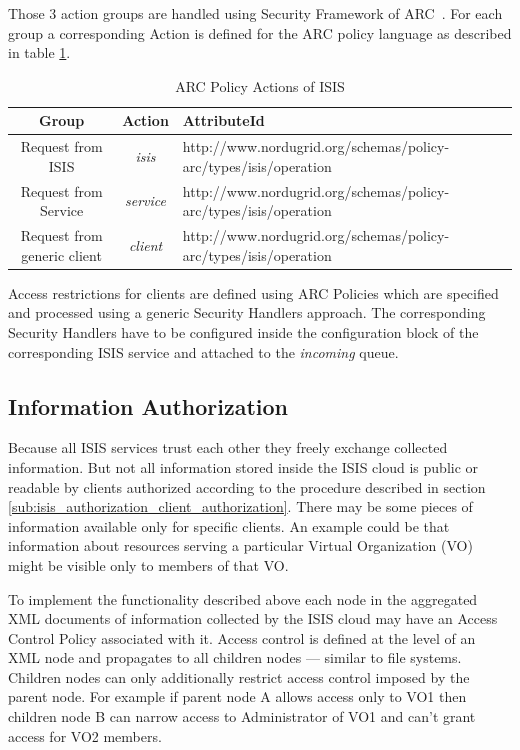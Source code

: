 \documentclass{book}
\begin{document}
Those 3 action groups are handled using Security Framework of ARC~\cite{arc1-security}. For each group a corresponding
Action is defined for the ARC policy language as described in table \ref{tab:policy_actions}.

\begin{table}[h]
\caption{ARC Policy Actions of ISIS}
\label{tab:policy_actions}
\begin{tabular}{|c|c|l|}
\hline
\textbf{Group}&\textbf{Action}&\textbf{AttributeId}\\
\hline
Request from ISIS&\textit{isis}&http://www.nordugrid.org/schemas/policy-arc/types/isis/operation\\
\hline
Request from Service&\textit{service}&http://www.nordugrid.org/schemas/policy-arc/types/isis/operation\\
\hline
Request from generic client&\textit{client}&http://www.nordugrid.org/schemas/policy-arc/types/isis/operation\\
\hline
\end{tabular}
\end{table}

Access restrictions for clients are defined using ARC Policies which are specified and 
processed using a generic Security Handlers approach. The corresponding Security Handlers have to be 
configured inside the configuration block of the corresponding ISIS service and attached to the
\textit{incoming} queue.



\subsection{Information Authorization}
\label{sub:isis_authorization_information_authorization}

Because all ISIS services trust each other they freely exchange collected information. But 
not all information stored inside the ISIS cloud is public or readable by clients authorized according 
to the procedure described in section \ref{sub:isis_authorization_client_authorization}. There
may be some pieces of information available only for specific clients. An example could be that
information about resources serving a particular Virtual Organization (VO) might be visible only to
members of that VO.

To implement the functionality described above each node in the aggregated XML documents of information
collected by the ISIS cloud may have an Access Control Policy associated with it. Access control is 
defined at the level of an XML node and propagates to all children nodes --- similar to file systems.
Children nodes can only additionally restrict access control imposed by the parent node. For example
if parent node A allows access only to VO1 then children node B can narrow access to Administrator 
of VO1 and can't grant access for VO2 members.
\end{document}
